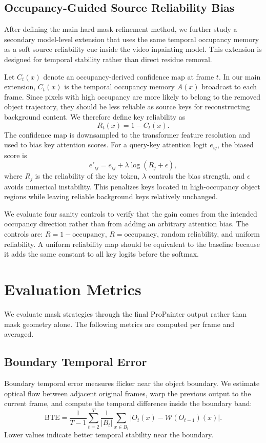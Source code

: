 \documentclass[nouppercase]{kaia}
\begin{document}
\subsection{Occupancy-Guided Source Reliability Bias}
After defining the main hard mask-refinement method, we further study a secondary model-level extension that uses the same temporal occupancy memory as a soft source reliability cue inside the video inpainting model. This extension is designed for temporal stability rather than direct residue removal.

Let $C_t(x)$ denote an occupancy-derived confidence map at frame $t$. In our main extension, $C_t(x)$ is the temporal occupancy memory $A(x)$ broadcast to each frame. Since pixels with high occupancy are more likely to belong to the removed object trajectory, they should be less reliable as source keys for reconstructing background content. We therefore define key reliability as
\begin{equation}
    R_t(x) = 1 - C_t(x).
\end{equation}
The confidence map is downsampled to the transformer feature resolution and used to bias key attention scores. For a query-key attention logit $e_{ij}$, the biased score is
\begin{equation}
    e'_{ij} = e_{ij} + \lambda \log(R_j + \epsilon),
\end{equation}
where $R_j$ is the reliability of the key token, $\lambda$ controls the bias strength, and $\epsilon$ avoids numerical instability. This penalizes keys located in high-occupancy object regions while leaving reliable background keys relatively unchanged.

We evaluate four sanity controls to verify that the gain comes from the intended occupancy direction rather than from adding an arbitrary attention bias. The controls are: $R=1-\mathrm{occupancy}$, $R=\mathrm{occupancy}$, random reliability, and uniform reliability. A uniform reliability map should be equivalent to the baseline because it adds the same constant to all key logits before the softmax.

\section{Evaluation Metrics}
We evaluate mask strategies through the final ProPainter output rather than mask geometry alone. The following metrics are computed per frame and averaged.

\subsection{Boundary Temporal Error}
Boundary temporal error measures flicker near the object boundary. We estimate optical flow between adjacent original frames, warp the previous output to the current frame, and compute the temporal difference inside the boundary band:
\begin{equation}
    \text{BTE} =
    \frac{1}{T-1}\sum_{t=2}^{T}\frac{1}{|B_t|}
    \sum_{x \in B_t} \left|O_t(x)-\mathcal{W}(O_{t-1})(x)\right|.
\end{equation}
Lower values indicate better temporal stability near the boundary.
\end{document}
